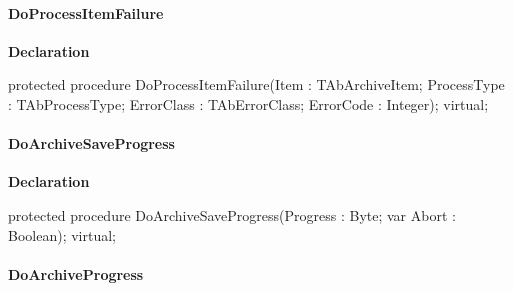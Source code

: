 \documentclass{report}
\newif\ifpdf
\begin{document}
\paragraph*{DoProcessItemFailure}\hspace*{\fill}

\label{AbArcTyp.TAbArchive-DoProcessItemFailure}
\begin{list}{}{
\setlength{\itemindent}{0cm}
\setlength{\listparindent}{0cm}
\setlength{\leftmargin}{\evensidemargin}
\addtolength{\leftmargin}{\tmplength}
\settowidth{\labelsep}{X}
\addtolength{\leftmargin}{\labelsep}
\setlength{\labelwidth}{\tmplength}
}
\item[\textbf{Declaration}\hfill]
\ifpdf
\begin{flushleft}
\fi
\begin{ttfamily}
protected procedure DoProcessItemFailure(Item : TAbArchiveItem; ProcessType : TAbProcessType; ErrorClass : TAbErrorClass; ErrorCode : Integer); virtual;\end{ttfamily}

\ifpdf
\end{flushleft}
\fi

\end{list}
\paragraph*{DoArchiveSaveProgress}\hspace*{\fill}

\label{AbArcTyp.TAbArchive-DoArchiveSaveProgress}
\begin{list}{}{
\setlength{\itemindent}{0cm}
\setlength{\listparindent}{0cm}
\setlength{\leftmargin}{\evensidemargin}
\addtolength{\leftmargin}{\tmplength}
\settowidth{\labelsep}{X}
\addtolength{\leftmargin}{\labelsep}
\setlength{\labelwidth}{\tmplength}
}
\item[\textbf{Declaration}\hfill]
\ifpdf
\begin{flushleft}
\fi
\begin{ttfamily}
protected procedure DoArchiveSaveProgress(Progress : Byte; var Abort : Boolean); virtual;\end{ttfamily}

\ifpdf
\end{flushleft}
\fi

\end{list}
\paragraph*{DoArchiveProgress}\hspace*{\fill}
\end{document}
